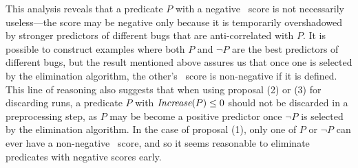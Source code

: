 This analysis reveals that a predicate $P$ with a negative \increase\
score is not necessarily useless---the score may be negative only
because it is temporarily overshadowed by stronger predictors of
different bugs that are anti-correlated with $P$.  It is possible to
construct examples where both $P$ and $\neg P$ are the best predictors
of different bugs, but the result mentioned above assures us that once
one is selected by the elimination algorithm, the other's
\increase\ score is non-negative if it is defined.  This line of
reasoning also suggests that when using proposal (2) or (3) for discarding runs,
a predicate $P$ with $\textit{Increase}(P) \leq 0$ should not be
discarded in a preprocessing step, as $P$ may be become a positive
predictor once $\neg P$ is selected by the elimination algorithm.  In
the case of proposal (1), only one of $P$ or $\neg P$ can ever have a
non-negative \increase\ score, and so it seems reasonable to eliminate
predicates with negative scores early.

